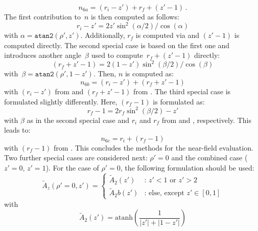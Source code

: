 \begin{equation}
  n_{6a} = (r_i - z') + r_f + (z'-1) \, .
\end{equation}
The first contribution to~$n$ is then computed as follows:
\begin{equation}
  r_i - z' = 2 z' \sin^2(\alpha/2) / \cos(\alpha) \label{eqn:ri_zp}
\end{equation}
with $\alpha = \texttt{atan2}(\rho', z')$.
Additionally, $r_f$ is computed via  and $(z'-1)$ is computed directly.
The second special case is based on the first one and introduces another angle~$\beta$
used to compute~$r_f + (z'-1)$ directly:
\begin{equation}
  (r_f + z' - 1) = 2 (1 - z') \sin^2(\beta/2) / \cos(\beta) \label{eqn:rf_zp_1}
\end{equation}
with~$\beta = \texttt{atan2}(\rho', 1-z')$.
Then, $n$ is computed as:
\begin{equation}
  n_{6b} = (r_i - z') + (r_f + z'-1)
\end{equation}
with $(r_i - z')$ from  and $(r_f + z' - 1)$ from .
The third special case is formulated slightly differently.
Here, $(r_f-1)$ is formulated as:
\begin{equation}
  r_f - 1 = 2 r_f \sin^2(\beta/2) - z' \label{eqn:rf_1}
\end{equation}
with $\beta$ as in the second special case
and $r_i$ and $r_f$ from  and , respectively.
This leads to:
\begin{equation}
  n_{6c} = r_i + (r_f - 1)
\end{equation}
with $(r_f - 1)$ from .
This concludes the methods for the near-field evaluation.
Two further special cases are considered next: $\rho' = 0$ and the combined case ($z'=0$, $z'=1$).
For the case of $\rho'=0$, the following formulation should be used:
\begin{equation}
  \tilde{A}_z (\rho'=0, z')
  = \begin{cases}
      \tilde{A}_2(z')  &:\, z' < 1 \textrm{ or } z' > 2 \\
      \tilde{A}_2b(z') &:\, \textrm{else, except } z' \in [0, 1]
    \end{cases}
\end{equation}
with
\begin{equation}
  \tilde{A}_2(z') = \textrm{atanh}\left( \frac{1}{|z'| + |1 - z'|} \right)
\end{equation}
